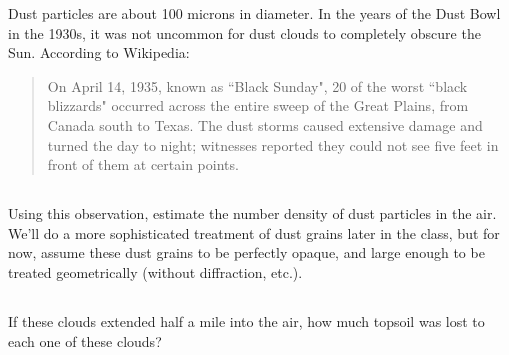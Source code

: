 \documentclass[11pt]{article}
\begin{document}
Dust particles are about 100 microns in diameter.  In the years of the Dust
Bowl in the 1930s, it was not uncommon for dust clouds to completely obscure
the Sun.  According to Wikipedia:
\begin{quote}
On April 14, 1935, known as ``Black Sunday", 20 of the worst ``black
blizzards" occurred across the entire sweep of the Great Plains, from Canada
south to Texas. The dust storms caused extensive damage and turned the day to
night; witnesses reported they could not see five feet in front of them at
certain points. 
\end{quote}

\subsection{}
Using this observation, estimate the number density of dust particles in the air.
We'll do a more sophisticated
treatment of dust grains later in the class, but for now, assume these dust grains to be perfectly
opaque, and large enough to be treated geometrically (without diffraction, etc.).  

\subsection{}
If these clouds extended half a mile into the air, how much topsoil was lost to each one of these clouds?
\end{document}
